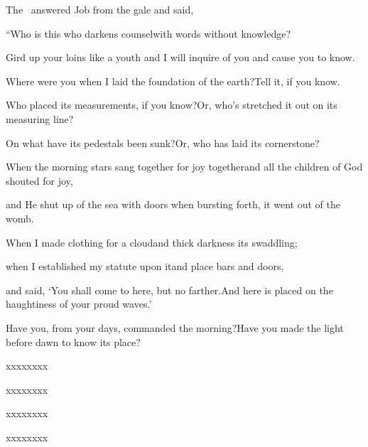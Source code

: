 
\begin{inparaenum}
  \pa{} The \lord\ answered Job from the gale and said,%

  \pb{} ``Who is this who darkens counsel\pa{}with words%
  without knowledge?%

  \pb{} Gird up your loins%
  like a youth%
  \pa{}and I will inquire of you and cause you to know.%

  \pb{} Where were you when I laid the foundation of the earth?\pa{}Tell it, if you know.%

  \pb{} Who placed its measurements, if you know?\pa{}Or, who's stretched it out on its measuring line?%

  \pb{} On what have its pedestals been sunk?\pa{}Or, who has laid its cornerstone?%

  \pb{} When the morning stars sang together for joy together\pa{}and all the children of God shouted for joy,%

  \pb{} and He shut up of the sea with doors%
  \pa{}when bursting forth, it went out of the womb.%

  \pb{} When I made clothing for a cloud\pa{}and thick darkness its swaddling;%

  \pb{} when I established my statute upon it\pa{}and place bars and doors,%

  \pb{} and said, `You shall come to here, but no farther.\pa{}And here is placed on the haughtiness of your proud waves.'%

  \pb{} Have you, from your days, commanded the morning?\pa{}Have you made the light before dawn to know its place?%

  \pb{} xxxx\pa{}xxxx%

  \pb{} xxxx\pa{}xxxx%

  \pb{} xxxx\pa{}xxxx%

  \pb{} xxxx\pa{}xxxx%


\end{inparaenum}
